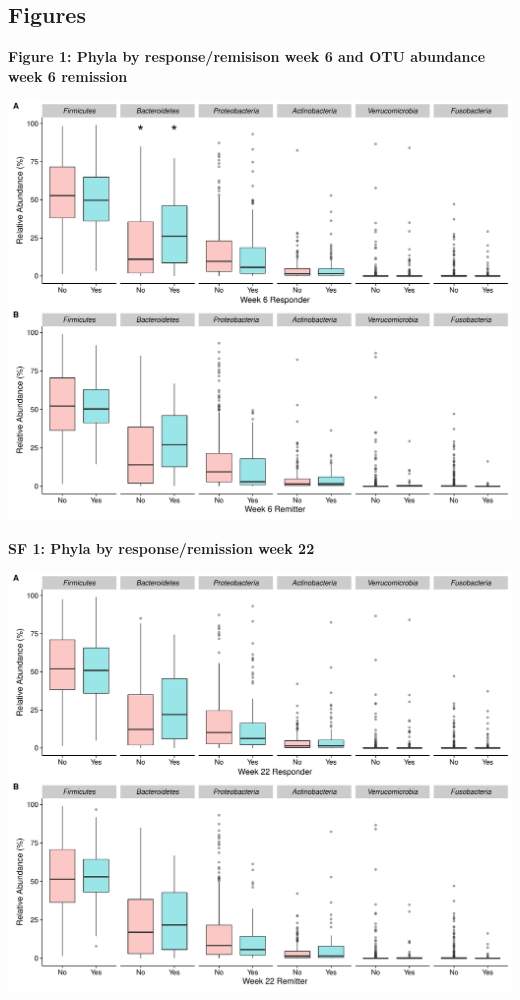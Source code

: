 \documentclass[11pt,]{article}
\begin{document}
\newpage

\subsection{Figures}\label{figures}

\textbf{Figure 1: Phyla by response/remisison week 6 and OTU abundance
week 6 remission}

\includegraphics{figures/Figure1_wk6phyla.pdf}

\newpage

\textbf{SF 1: Phyla by response/remission week 22}

\includegraphics{figures/SF1.pdf}
\end{document}

